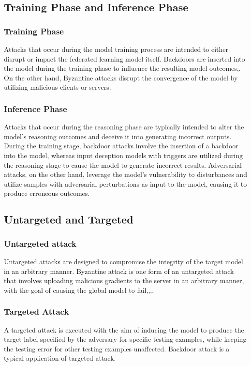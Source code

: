 \documentclass[conference]{IEEEtran}
\begin{document}
\subsection{Training Phase and Inference Phase}
\subsubsection{Training Phase}Attacks that occur during the model training process are
intended to either disrupt or impact the federated learning model itself. Backdoors are
inserted into the model during the training phase to influence the resulting model outcomes\cite{b45},\cite{b46}.
On the other hand, Byzantine attacks disrupt the convergence of the model by utilizing malicious
clients or servers\cite{b29}.
\subsubsection{Inference Phase}Attacks that occur during the reasoning phase are
typically intended to alter the model's reasoning outcomes and deceive it
into generating incorrect outputs\cite{b47}. During the training stage, backdoor
attacks involve the insertion of a backdoor into the model, whereas
input deception models with triggers are utilized during the
reasoning stage to cause the model to generate incorrect results.
Adversarial attacks, on the other hand, leverage the model's vulnerability
to disturbances and utilize samples with adversarial perturbations as input
to the model, causing it to produce erroneous outcomes.

\subsection{Untargeted and Targeted}
\subsubsection{Untargeted attack}Untargeted attacks are designed to compromise
the integrity of the target model in an arbitrary manner.
Byzantine attack is one form of an untargeted attack that involves
uploading malicious gradients to the server in an arbitrary manner,
with the goal of causing the global model to fail\cite{b48},\cite{b49},\cite{b50},\cite{b51}.
\subsubsection{Targeted Attack}A targeted attack is executed with
the aim of inducing the model to produce the target label specified by the
adversary for specific testing examples, while keeping the testing error for
other testing examples unaffected\cite{b51}. Backdoor attack is a typical application of targeted attack.
\end{document}
